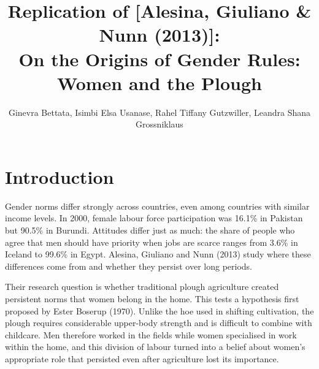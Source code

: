 \documentclass[12pt,a4paper]{article}
\title{Replication of [Alesina, Giuliano & Nunn (2013)]:\\{} On the Origins of Gender Rules: Women and the Plough}
\author{Ginevra Bettata, Isimbi Elsa Usanase, Rahel Tiffany Gutzwiller, Leandra Shana Grossniklaus}
\newif\ifshowinstr
\newcommand{\instr}[1]{\ifshowinstr{\leavevmode\color{gray}\itshape\small [#1]\par}\fi}
\begin{document}
\maketitle

\instr{The grey italic passages provide you with some short instructions. Please delete these passages before you submit by setting \texttt{\textbackslash showinstrfalse} in the preamble. \textbf{The report should be 5 to 7 pages long.} This includes tables and figures but excludes any references and Appendix A. \textbf{Appendix A} tries to guide you through some of the replication exercises. It \textbf{has to be filled in and submitted together with the report}. Appendix~B is only meant as a help for you, and you can delete it before submitting.}

\section{Introduction}
Gender norms differ strongly across countries, even among countries with similar income levels. In 2000, female labour force participation was 16.1\% in Pakistan but 90.5\% in Burundi. Attitudes differ just as much: the share of people who agree that men should have priority when jobs are scarce ranges from 3.6\% in Iceland to 99.6\% in Egypt. Alesina, Giuliano and Nunn (2013) study where these differences come from and whether they persist over long periods.

Their research question is whether traditional plough agriculture created persistent norms that women belong in the home. This tests a hypothesis first proposed by Ester Boserup (1970). Unlike the hoe used in shifting cultivation, the plough requires considerable upper-body strength and is difficult to combine with childcare. Men therefore worked in the fields while women specialised in work within the home, and this division of labour turned into a belief about women's appropriate role that persisted even after agriculture lost its importance.
\end{document}
